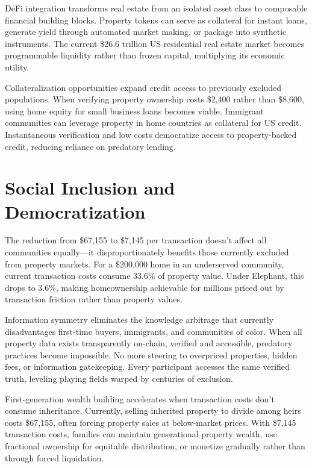 DeFi integration transforms real estate from an isolated asset class to composable financial building blocks. Property tokens can serve as collateral for instant loans, generate yield through automated market making, or package into synthetic instruments. The current \$26.6 trillion US residential real estate market becomes programmable liquidity rather than frozen capital, multiplying its economic utility.

Collateralization opportunities expand credit access to previously excluded populations. When verifying property ownership costs \$2,400 rather than \$8,600, using home equity for small business loans becomes viable. Immigrant communities can leverage property in home countries as collateral for US credit. Instantaneous verification and low costs democratize access to property-backed credit, reducing reliance on predatory lending.

\section{Social Inclusion and Democratization}

The reduction from \$67,155 to \$7,145 per transaction doesn't affect all communities equally—it disproportionately benefits those currently excluded from property markets. For a \$200,000 home in an underserved community, current transaction costs consume 33.6\% of property value. Under Elephant, this drops to 3.6\%, making homeownership achievable for millions priced out by transaction friction rather than property values.

Information symmetry eliminates the knowledge arbitrage that currently disadvantages first-time buyers, immigrants, and communities of color. When all property data exists transparently on-chain, verified and accessible, predatory practices become impossible. No more steering to overpriced properties, hidden fees, or information gatekeeping. Every participant accesses the same verified truth, leveling playing fields warped by centuries of exclusion.

First-generation wealth building accelerates when transaction costs don't consume inheritance. Currently, selling inherited property to divide among heirs costs \$67,155, often forcing property sales at below-market prices. With \$7,145 transaction costs, families can maintain generational property wealth, use fractional ownership for equitable distribution, or monetize gradually rather than through forced liquidation.

